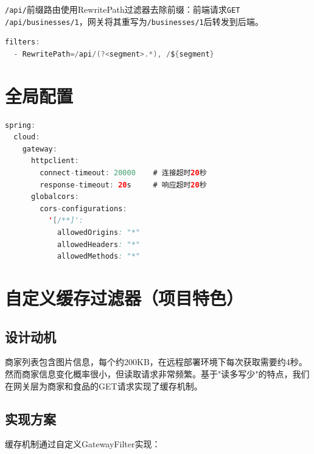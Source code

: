 \verb|/api/|前缀路由使用RewritePath过滤器去除前缀：前端请求\verb|GET /api/businesses/1|，网关将其重写为\verb|/businesses/1|后转发到后端。

\begin{lstlisting}[language=Java, caption=路径重写过滤器]
filters:
  - RewritePath=/api/(?<segment>.*), /${segment}
\end{lstlisting}

\section{全局配置}

\begin{lstlisting}[language=Java, caption=CORS与超时配置]
spring:
  cloud:
    gateway:
      httpclient:
        connect-timeout: 20000    # 连接超时20秒
        response-timeout: 20s     # 响应超时20秒
      globalcors:
        cors-configurations:
          '[/**]':
            allowedOrigins: "*"
            allowedHeaders: "*"
            allowedMethods: "*"
\end{lstlisting}

\section{自定义缓存过滤器（项目特色）}

\subsection{设计动机}

商家列表包含图片信息，每个约200KB，在远程部署环境下每次获取需要约4秒。然而商家信息变化概率很小，但读取请求非常频繁。基于"读多写少"的特点，我们在网关层为商家和食品的GET请求实现了缓存机制。

\subsection{实现方案}

缓存机制通过自定义GatewayFilter实现：

